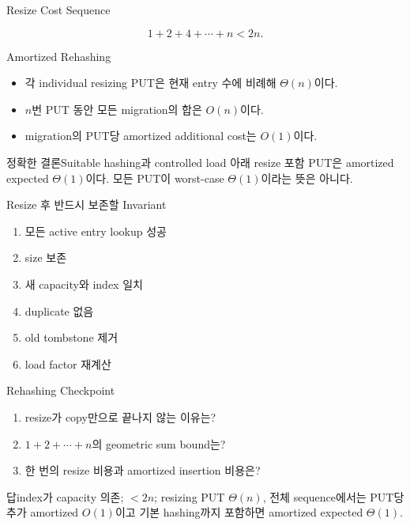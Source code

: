 \begin{frame}{Resize Cost Sequence}
\centering{}
\[
1+2+4+\cdots+n<2n.
\]
\end{frame}
\begin{frame}{Amortized Rehashing}
\begin{itemize}\item 각 individual resizing PUT은 현재 entry 수에 비례해 $\Theta(n)$이다.\item $n$번 PUT 동안 모든 migration의 합은 $O(n)$이다.\item migration의 PUT당 amortized additional cost는 $O(1)$이다.\end{itemize}
\begin{alertblock}{정확한 결론}Suitable hashing과 controlled load 아래 resize 포함 PUT은 amortized expected $\Theta(1)$이다. 모든 PUT이 worst-case $\Theta(1)$이라는 뜻은 아니다.\end{alertblock}
\end{frame}
\begin{frame}{Resize 후 반드시 보존할 Invariant}
\begin{enumerate}\item 모든 active entry lookup 성공\item size 보존\item 새 capacity와 index 일치\item duplicate 없음\item old tombstone 제거\item load factor 재계산\end{enumerate}
\end{frame}
\begin{frame}{Rehashing Checkpoint}
\begin{enumerate}\item resize가 copy만으로 끝나지 않는 이유는?\item $1+2+\cdots+n$의 geometric sum bound는?\item 한 번의 resize 비용과 amortized insertion 비용은?\end{enumerate}
\begin{exampleblock}{답}index가 capacity 의존; $<2n$; resizing PUT $\Theta(n)$, 전체 sequence에서는 PUT당 추가 amortized $O(1)$이고 기본 hashing까지 포함하면 amortized expected $\Theta(1)$.\end{exampleblock}
\end{frame}
